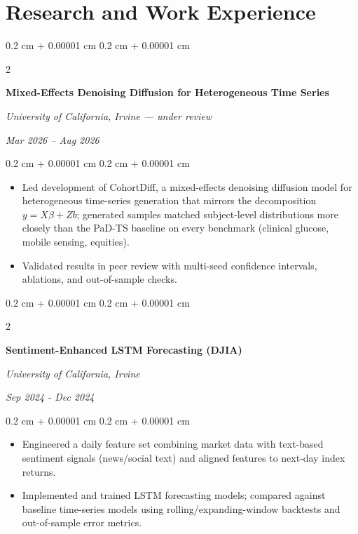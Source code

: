 \documentclass[10pt, letterpaper]{article}
\newenvironment{highlights}{
    \begin{itemize}[
        topsep=0.05 cm,
        parsep=0.05 cm,
        partopsep=0pt,
        itemsep=0pt,
        leftmargin=0.4 cm + 10pt
    ]
}{
    \end{itemize}
} %
\newenvironment{onecolentry}{
    \begin{adjustwidth}{
        0.2 cm + 0.00001 cm
    }{
        0.2 cm + 0.00001 cm
    }
}{
    \end{adjustwidth}
} %
\newenvironment{twocolentry}[2][]{
    \onecolentry
    \def\secondColumn{#2}
    \setcolumnwidth{\fill, 4.5 cm}
    \begin{paracol}{2}
}{
    \switchcolumn \raggedleft \secondColumn
    \end{paracol}
    \endonecolentry
} %
\begin{document}
        \section{Research and Work Experience}
        \begin{twocolentry}{
        \textit{Mar 2026 – Aug 2026}}
            \textbf{Mixed-Effects Denoising Diffusion for Heterogeneous Time Series}

            \textit{University of California, Irvine — under review}
        \end{twocolentry}
        \vspace{0.05 cm}
        \begin{onecolentry}
            \begin{highlights}
                \item Led development of CohortDiff, a mixed-effects denoising diffusion model for heterogeneous time-series generation that mirrors the decomposition $y = X\beta + Zb$; generated samples matched subject-level distributions more closely than the PaD-TS baseline on every benchmark (clinical glucose, mobile sensing, equities).
                \item Validated results in peer review with multi-seed confidence intervals, ablations, and out-of-sample checks.
            \end{highlights}
        \end{onecolentry}

        \vspace{0.05 cm}
        \begin{twocolentry}{
        \textit{Sep 2024 - Dec 2024}}
            \textbf{Sentiment-Enhanced LSTM Forecasting (DJIA)}

            \textit{University of California, Irvine}
        \end{twocolentry}
        \vspace{0.05 cm}
        \begin{onecolentry}
            \begin{highlights}
                \item Engineered a daily feature set combining market data with text-based sentiment signals (news/social text) and aligned features to next-day index returns.
                \item Implemented and trained LSTM forecasting models; compared against baseline time-series models using rolling/expanding-window backtests and out-of-sample error metrics.
            \end{highlights}
        \end{onecolentry}
\end{document}
